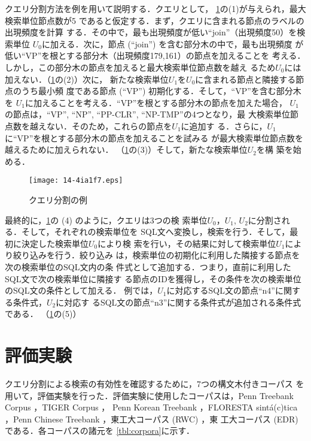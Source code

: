 \documentclass[japanese]{jnlp_1.3e}
\begin{document}
クエリ分割方法を例を用いて説明する．クエリとして，
\figurename\ref{fig:divide}の(1)が与えられ，最大検索単位節点数が5
であると仮定する．まず，クエリに含まれる節点のラベルの出現頻度を計算
する．その中で，最も出現頻度が低い``join''（出現頻度50）を検索単位
$U_0$に加える．次に，節点 (``join'') を含む部分木の中で，最も出現頻度
が低い``VP''を根とする部分木（出現頻度179,161）の節点を加えることを
考える．しかし，この部分木の節点を加えると最大検索単位節点数を越え
るため$U_0$には加えない．（\figurename\ref{fig:divide}の(2)）次に，
新たな検索単位$U_1$を$U_0$に含まれる節点と隣接する節点のうち最小頻
度である節点 (``VP'') 初期化する．そして，``VP''を含む部分木を
$U_1$に加えることを考える．``VP''を根とする部分木の節点を加えた場合，
$U_1$の節点は，``VP'', ``NP'', ``PP-CLR'', ``NP-TMP''の4つとなり，最
大検索単位節点数を越えない．そのため，これらの節点を$U_1$に追加す
る．さらに，$U_1$に``VP''を根とする部分木の節点を加えることを試みる
が最大検索単位節点数を越えるために加えられない．
（\figurename\ref{fig:divide}の(3)）そして，新たな検索単位$U_2$を構
築を始める．

\begin{figure}[t]
\begin{center}
\texttt{[image: 14-4ia1f7.eps]}
	\caption{クエリ分割の例}
    	\label{fig:divide}
\end{center}
\end{figure}

最終的に，\figurename\ref{fig:divide}の (4) のように，クエリは3つの検
索単位$U_0$，$U_1$, $U_2$に分割される．そして，それぞれの検索単位を
SQL文へ変換し，検索を行う．そして，最初に決定した検索単位$U_0$により検
索を行い，その結果に対して検索単位$U_1$により絞り込みを行う．絞り込み
は，検索単位の初期化に利用した隣接する節点を次の検索単位のSQL文内の条
件式として追加する．つまり，直前に利用したSQL文で次の検索単位に隣接す
る節点のIDを獲得し，その条件を次の検索単位のSQL文の条件として加える．
例では，$U_1$に対応するSQL文の節点``n4''に関する条件式，$U_2$に対応す
るSQL文の節点``n3''に関する条件式が追加される条件式である．
（\figurename\ref{fig:divide}の(5)）



\section{評価実験}

クエリ分割による検索の有効性を確認するために，7つの構文木付きコーパス
を用いて，評価実験を行った．評価実験に使用したコーパスは，Penn
Treebank Corpus \cite{marcus:1994:a}，TIGER Corpus \cite{konig:2003:b}，
Penn Korean Treebank \cite{han:2002:a}，FLORESTA
sint\'{a}(c)tica \cite{afonso:2002:a}，Penn Chinese
Treebank \cite{xue:2002:a}，東工大コーパス (RWC) \cite{noro:2004:a}，東
工大コーパス (EDR) \cite{noro:2002:a}である．各コーパスの諸元を
\tablename\ref{tbl:corpora}に示す．
\end{document}
